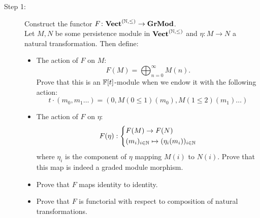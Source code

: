 \begin{description}
	\item[Step 1:] Construct the functor $F \colon {\normalfont\textbf{Vect}}^{(\mathbb{N}, \leq)} \rightarrow {\normalfont\textbf{GrMod}}$. \\
	\noindent Let $M, N$ be some persistence module in ${\normalfont\textbf{Vect}}^{(\mathbb{N}, \leq)}$ and $\eta : M \rightarrow N$ a natural transformation. Then define: 
	\begin{itemize}
		\item The action of $F$ on $M$: 
		\begin{equation*}
			F(M) = \bigoplus_{n = 0}^{\infty} M(n).
		\end{equation*}
		Prove that this is an $\mathbb{F}[t]$-module when we endow it with the following action:
		\begin{equation*}
			t \cdot (m_0, m_1 \ldots) = (0, M(0 \leq 1) (m_0), M(1 \leq 2) (m_1) \ldots) 
		\end{equation*}
		\item The action of $F$ on $\eta$:
		\begin{equation*}
			F (\eta) : 
			\begin{dcases}
				F(M) \rightarrow F(N) \\
				(m_i)_{i \in \mathbb{N}} \mapsto (\eta_i (m_i))_{i \in \mathbb{N}}
			\end{dcases}
		\end{equation*}
		where $\eta_i$ is the component of $\eta$ mapping $M(i)$ to $N(i)$. Prove that this map is indeed a graded module morphism. 
		\item Prove that $F$ maps identity to identity. 
		\item Prove that $F$ is functorial with respect to composition of natural transformations.  
	\end{itemize}
	

\end{description}
